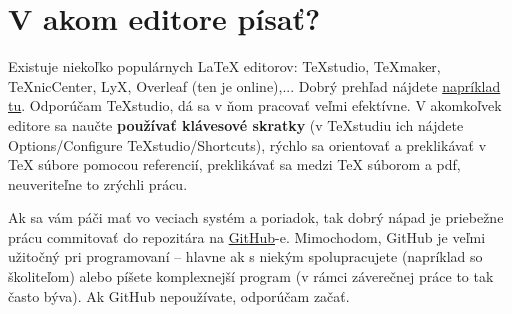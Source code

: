 \chapter{V akom editore písať?}\label{sec:aky_editor}

Existuje niekoľko populárnych LaTeX editorov: TeXstudio, TeXmaker, TeXnicCenter, LyX, Overleaf (ten je online),... Dobrý prehľad nájdete \href{https://beebom.com/best-latex-editors/}{napríklad tu}. Odporúčam TeXstudio, dá sa v ňom pracovať veľmi efektívne. V akomkoľvek editore sa naučte \textbf{používať klávesové skratky} (v TeXstudiu ich nájdete Options/Configure TeXstudio/Shortcuts), rýchlo sa orientovať a preklikávať v TeX súbore pomocou referencií, preklikávať sa medzi TeX súborom a pdf, neuveriteľne to zrýchli prácu.

Ak sa vám páči mať vo veciach systém a poriadok, tak dobrý nápad je priebežne prácu commitovať do repozitára na \href{https://github.com/}{GitHub}-e. Mimochodom, GitHub je veľmi užitočný pri programovaní -- hlavne ak s niekým spolupracujete (napríklad so školiteľom) alebo píšete komplexnejší program (v rámci záverečnej práce to tak často býva). Ak GitHub nepoužívate, odporúčam začať.